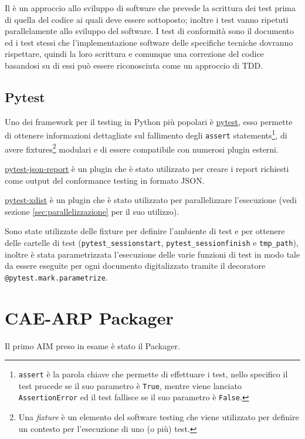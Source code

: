 Il  è un approccio allo sviluppo di software che prevede la scrittura dei test prima di quella del codice ai quali deve essere sottoposto; inoltre i test vanno ripetuti parallelamente allo sviluppo del software.
I test di conformità sono il documento ed i test stessi che l'implementazione software delle specifiche tecniche dovranno rispettare, quindi la loro scrittura e comunque una correzione del codice basandosi su di essi può essere riconosciuta come un approccio di \ac{TDD}. %


\subsection{Pytest} \label{ssec:pytest} %
Uno dei framework per il testing in Python più popolari è \href{https://pytest.org}{pytest}, esso permette di ottenere informazioni dettagliate sul fallimento degli \texttt{assert} statements\footnote{\texttt{assert} è la parola chiave che permette di effettuare i test, nello specifico il test procede se il suo parametro è \texttt{True}, mentre viene lanciato \texttt{AssertionError} ed il test fallisce se il suo parametro è \texttt{False}.}, di avere fixtures\footnote{Una \textit{fixture} è un elemento del software testing che viene utilizzato per definire un contesto per l'esecuzione di uno (o più) test.} modulari e di essere compatibile con numerosi plugin esterni.

\href{https://github.com/numirias/pytest-json-report}{pytest-json-report} è un plugin che è stato utilizzato per creare i report richiesti come output del conformance testing in formato JSON.

\href{https://pytest-xdist.readthedocs.io/}{pytest-xdist} è un plugin che è stato utilizzato per parallelizzare l'esecuzione (vedi sezione \ref{sec:parallelizzazione} per il suo utilizzo).

Sono state utilizzate delle fixture per definire l'ambiente di test e per ottenere delle cartelle di test (\verb|pytest_sessionstart|, \verb|pytest_sessionfinish| e \verb|tmp_path|), inoltre è stata parametrizzata l'esecuzione delle varie funzioni di test in modo tale da essere eseguite per ogni documento digitalizzato tramite il decoratore \texttt{@pytest.mark.parametrize}.


\section{\acs{CAE}-\acs{ARP} Packager} \label{sec:test-packager}
Il primo \ac{AIM} preso in esame è stato il Packager.

